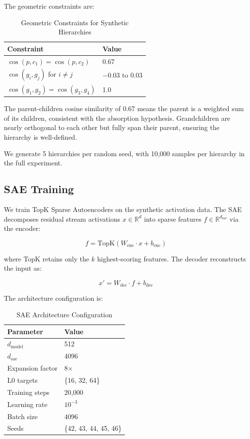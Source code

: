 \documentclass{article}
\begin{document}
The geometric constraints are:

\begin{table}[h]
\caption{Geometric Constraints for Synthetic Hierarchies}
\label{tab:geom_constraints}
\centering
\begin{tabular}{ll}
\toprule
Constraint & Value \\
\midrule
$\cos(p, c_1) = \cos(p, c_2)$ & 0.67 \\
$\cos(g_i, g_j)$ for $i \neq j$ & $-0.03$ to $0.03$ \\
$\cos(g_1, g_2) = \cos(g_3, g_4)$ & 1.0 \\
\bottomrule
\end{tabular}
\end{table}

The parent-children cosine similarity of 0.67 means the parent is a weighted sum of its children, consistent with the absorption hypothesis. Grandchildren are nearly orthogonal to each other but fully span their parent, ensuring the hierarchy is well-defined.

We generate 5 hierarchies per random seed, with 10,000 samples per hierarchy in the full experiment.

\subsection{SAE Training}

We train TopK Sparse Autoencoders on the synthetic activation data. The SAE decomposes residual stream activations $x \in \mathbb{R}^d$ into sparse features $f \in \mathbb{R}^{d_{\text{sae}}}$ via the encoder:

\begin{equation}
f = \text{TopK}(W_{\text{enc}} \cdot x + b_{\text{enc}})
\end{equation}

where TopK retains only the $k$ highest-scoring features. The decoder reconstructs the input as:

\begin{equation}
x' = W_{\text{dec}} \cdot f + b_{\text{dec}}
\end{equation}

The architecture configuration is:

\begin{table}[h]
\caption{SAE Architecture Configuration}
\label{tab:sae_config}
\centering
\begin{tabular}{ll}
\toprule
Parameter & Value \\
\midrule
$d_{\text{model}}$ & 512 \\
$d_{\text{sae}}$ & 4096 \\
Expansion factor & 8$\times$ \\
L0 targets & \{16, 32, 64\} \\
Training steps & 20,000 \\
Learning rate & $10^{-3}$ \\
Batch size & 4096 \\
Seeds & \{42, 43, 44, 45, 46\} \\
\bottomrule
\end{tabular}
\end{table}
\end{document}
